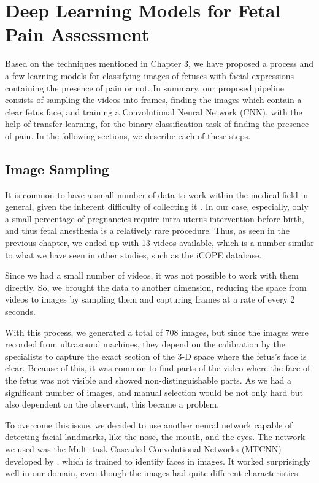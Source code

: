 \chapter{Deep Learning Models for Fetal Pain Assessment}

Based on the techniques mentioned in Chapter 3, we have proposed a process and a few learning models for classifying images of fetuses with facial expressions containing the presence of pain or not. In summary, our proposed pipeline consists of sampling the videos into frames, finding the images which contain a clear fetus face, and training a Convolutional Neural Network (CNN), with the help of transfer learning, for the binary classification task of finding the presence of pain. In the following sections, we describe each of these steps.

\section{Image Sampling}

It is common to have a small number of data to work within the medical field in general, given the inherent difficulty of collecting it \citep{abs-1908-00473}. In our case, especially, only a small percentage of pregnancies require intra-uterus intervention before birth, and thus fetal anesthesia is a relatively rare procedure. Thus, as seen in the previous chapter, we ended up with 13 videos available, which is a number similar to what we have seen in other studies, such as the iCOPE database.

Since we had a small number of videos, it was not possible to work with them directly. So, we brought the data to another dimension, reducing the space from videos to images by sampling them and capturing frames at a rate of every 2 seconds. 

With this process, we generated a total of 708 images, but since the images were recorded from ultrasound machines, they depend on the calibration by the specialists to capture the exact section of the 3-D space where the fetus's face is clear. Because of this, it was common to find parts of the video where the face of the fetus was not visible and showed non-distinguishable parts. As we had a significant number of images, and manual selection would be not only hard but also dependent on the observant, this became a problem.

To overcome this issue, we decided to use another neural network capable of detecting facial landmarks, like the nose, the mouth, and the eyes. The network we used was the Multi-task Cascaded Convolutional Networks (MTCNN) developed by \cite{ZhangZL016}, which is trained to identify faces in images. It worked surprisingly well in our domain, even though the images had quite different characteristics.

